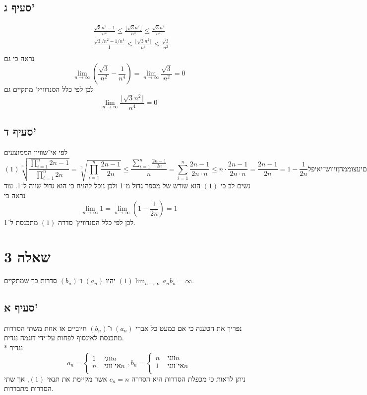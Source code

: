 \subsection{סעיף ג'}
\begin{align*}
	& \frac{\sqrt{3} n^2 - 1}{n^4} \le \frac{\lfloor \sqrt{3} n^2 \rfloor}{n^4} \le \frac{\sqrt{3} n^2}{n^4} \\
	& \frac{\sqrt{3}/n^2 - 1/n^4}{1} \le \frac{\lfloor \sqrt{3} n^2 \rfloor}{n^4} \le \frac{\sqrt{3}}{n^2} \\
\end{align*}
נראה כי גם
$$
	\lim_{n \to \infty} \left(\frac{\sqrt{3}}{n^2} - \frac{1}{n^4} \right)
	=
	\lim_{n \to \infty} \frac{\sqrt{3}}{n^2}
	= 0
$$
לכן לפי כלל הסנדוויץ' מתקיים גם
$$
	\lim_{n \to \infty} \frac{\lfloor \sqrt{3} n^2 \rfloor}{n^4} = 0
$$

\subsection{סעיף ד'}
לפי אי־שוויון הממוצעים
$$
	(1) \sqrt[n]{\frac{\displaystyle \prod_{i = 1}^{n} 2n - 1}{\displaystyle \prod_{i = 1}^{n} 2n }}
	= \sqrt[n]{\displaystyle \prod_{i = 1}^{n} \frac{2n - 1}{2n}}
	\le \frac{\displaystyle \sum_{i = 1}^{n} \frac{2n - 1}{2n}}{n}
	= \displaystyle \sum_{i = 1}^{n} \frac{2n - 1}{2n \cdot n}
	\le \displaystyle n \cdot \frac{2n - 1}{2n \cdot n}
	= \frac{2n - 1}{2n} 
	= 1 - \frac{1}{2n} 
לפי אי־שוויון הממוצעים
$$
נשים לב כי $(1)$ הוא שורש של מספר גדול מ־1 ולכן נוכל להניח כי הוא גדול שווה ל־1.
עוד נראה כי
$$
	\lim_{n \to \infty} 1 = \lim_{n \to \infty} \left( 1 - \frac{1}{2n} \right) = 1
$$
לכן לפי כלל הסנדוויץ' סדרה $(1)$ מתכנסת ל־1.

\section{שאלה 3}
יהיו $(a_n)$ ו־$(b_n)$ סדרות כך שמתקיים $(1) \lim_{n \to \infty} a_n b_n = \infty$.

\subsection{סעיף א'}
נפריך את הטענה כי אם כמעט כל אברי $(a_n)$ ו־$(b_n)$ חיוביים אז אחת משתי הסדרות מתכנסת לאינסוף לפחות על־ידי דוגמה נגדית. \\*
נגדיר
$$
	a_n = \begin{cases}
		1 & \text{ זוגי} n \\
		n & \text{ אי־זוגי} n \\
	\end{cases},
	b_n = \begin{cases}
		n & \text{ זוגי} n \\
		1 & \text{ אי־זוגי} n \\
	\end{cases}
$$
ניתן לראות כי מכפלת הסדרות היא הסדרה $c_n = n$ אשר מקיימת את תנאי $(1)$, אך שתי הסדרות מתבדרות.

